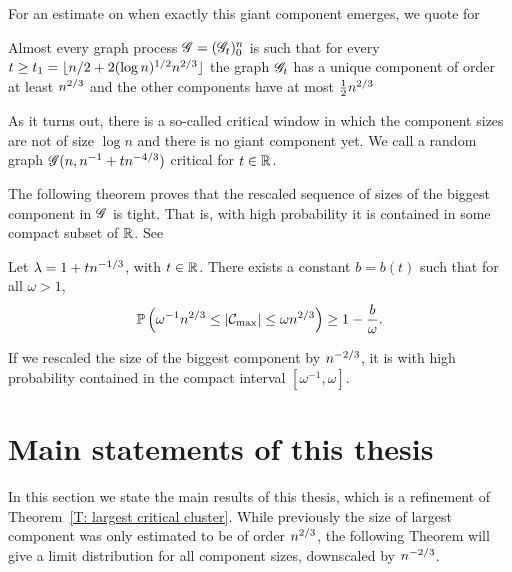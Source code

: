 For an estimate on when exactly this giant component emerges, we quote \cite[Theorem 6.8, p.142]{Bollobas.2001} for
\begin{theorem}
	Almost every graph process $\mathscr{G} = (\mathscr{G}_t)_0^n$ is such that 
	for every $t \geq t_1 = \lfloor n/2 + 2(\log n)^{1/2}n^{2 / 3} \rfloor$ 
	the graph $\mathscr{G}_t$ has a unique component of order at least $n^{2 / 3}$ and the other components have at most $\frac{1}{2}n^{2 / 3}$
\end{theorem}





As it turns out, there is a so-called critical window in which the component sizes are not of size $\log n$ and there is no giant component yet.
We call a random graph $\mathscr{G}(n, n^{-1} + tn^{-4 / 3})$ critical for $t \in \mathbb{R}$.

The following theorem proves that the rescaled sequence of sizes of the biggest component in $\mathscr{G}$ is tight.
That is, with high probability it is contained in some compact subset of $\mathbb{R}$.
See \cite[Theorem 5.1, p.150]{vanderHofstad.2016}
\begin{theorem} \label{T: largest critical cluster}
	Let $\lambda = 1 + tn^{-1 / 3}$, with $t \in \mathbb{R}$.
	There exists a constant $b = b(t)$ such that for all $\omega > 1$,
	\begin{equation}
		\mathbb{P}\left( \omega^{-1} n^{2 / 3} \leq |\mathcal{C}_{\max}| \leq \omega n^{2 / 3}\right) \geq 1 - \frac{b}{\omega}.
	\end{equation}	
\end{theorem}

If we rescaled the size of the biggest component by $n^{-2 / 3}$,
it is with high probability contained in the compact interval $[\omega^{-1}, \omega]$.











\section{Main statements of this thesis}

In this section we state the main results of this thesis,
which is a refinement of Theorem~\ref{T: largest critical cluster}.
While previously the size of largest component was only estimated to be of order $n^{2 / 3}$,
the following Theorem will give a limit distribution for all component sizes, downscaled by $n^{-2 / 3}$.

